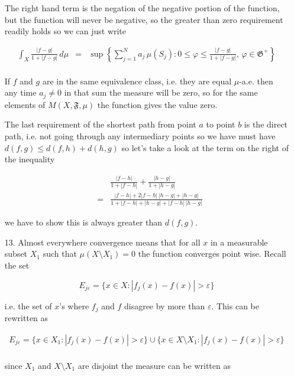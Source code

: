 \documentclass[oneside]{book}
\begin{document}
\begin{enumerate}
The right hand term is the negation of the negative portion of the function, but the function will never be negative, so the greater than zero requirement readily holds so we can just write

\begin{eqnarray}
\int_X \frac{|f-g|}{1+|f-g|}\, d\mu&=& \sup \left\{ \sum_{j=1}^N a_j\, \mu(S_j): 0 \le \varphi \le \frac{|f-g|}{1+|f-g|},\, \varphi \in \mathfrak{G}^+ \right\}\nonumber\\
\end{eqnarray}

If $f$ and $g$ are in the same equivalence class, i.e. they are equal $\mu$-a.e. then any time $a_j \neq 0$ in that sum the measure will be zero, so for the same elements of $M(X,\mathfrak{F},\mu)$ the function gives the value zero.

The last requirement of the shortest path from point $a$ to point $b$ is the direct path, i.e. not going through any intermediary points so we have must have $d(f,g) \le d(f,h)+d(h,g)$ so let's take a look at the term on the right of the inequality

\begin{eqnarray}
&&\frac{|f-h|}{1+|f-h|} + \frac{|h-g|}{1+|h-g|} \nonumber\\
&=& \frac{|f-h|+2|f-h|\,|h-g|+|h-g|}{1+|f-h| + |h-g| + |f-h|\,|h-g| }
\end{eqnarray}

we have to show this is always greater than $d(f,g)$.

\item[13.] Almost everywhere convergence means that for all $x$ in a measurable subset $X_1$ such that $\mu(X \setminus X_1)=0$ the function converges point wise. Recall the set

\begin{equation}
E_{j \varepsilon} = \{ x \in X: |f_j(x)-f(x)| > \varepsilon \}
\end{equation}

i.e. the set of $x$'s where $f_j$ and $f$ disagree by more than $\varepsilon$. This can be rewritten as

\begin{eqnarray}
E_{j \varepsilon} = \{ x \in X_1: |f_j(x)-f(x)| > \varepsilon \} \cup \{ x \in X \setminus X_1: |f_j(x)-f(x)| > \varepsilon \} \nonumber\\
\end{eqnarray}

since $X_1$ and $X \setminus X_1$ are disjoint the measure can be written as


\end{enumerate}
\end{document}
